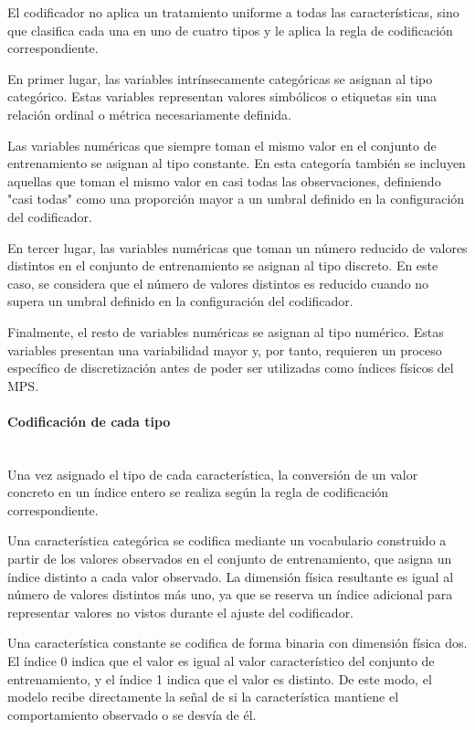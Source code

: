 \documentclass[12pt]{extarticle}
\numberwithin{equation}{section}
\begin{document}
\begin{refsection}
El codificador no aplica un tratamiento uniforme a todas las características, sino que clasifica cada una en uno de cuatro tipos y le aplica la regla de codificación correspondiente.

En primer lugar, las variables intrínsecamente categóricas se asignan al tipo categórico. Estas variables representan valores simbólicos o etiquetas sin una relación ordinal o métrica necesariamente definida.

Las variables numéricas que siempre toman el mismo valor en el conjunto de entrenamiento se asignan al tipo constante. En esta categoría también se incluyen aquellas que toman el mismo valor en casi todas las observaciones, definiendo "casi todas" como una proporción mayor a un umbral definido en la configuración del codificador.

En tercer lugar, las variables numéricas que toman un número reducido de valores distintos en el conjunto de entrenamiento se asignan al tipo discreto. En este caso, se considera que el número de valores distintos es reducido cuando no supera un umbral definido en la configuración del codificador.

Finalmente, el resto de variables numéricas se asignan al tipo numérico. Estas variables presentan una variabilidad mayor y, por tanto, requieren un proceso específico de discretización antes de poder ser utilizadas como índices físicos del MPS.

\paragraph{Codificación de cada tipo}
\label{par:codificacioncadatipo}
\mbox{}\\

Una vez asignado el tipo de cada característica, la conversión de un valor concreto en un índice entero se realiza según la regla de codificación correspondiente.

Una característica categórica se codifica mediante un vocabulario construido a partir de los valores observados en el conjunto de entrenamiento, que asigna un índice distinto a cada valor observado. La dimensión física resultante es igual al número de valores distintos más uno, ya que se reserva un índice adicional para representar valores no vistos durante el ajuste del codificador.

Una característica constante se codifica de forma binaria con dimensión física dos. El índice 0 indica que el valor es igual al valor característico del conjunto de entrenamiento, y el índice 1 indica que el valor es distinto. De este modo, el modelo recibe directamente la señal de si la característica mantiene el comportamiento observado o se desvía de él.


\end{refsection}
\end{document}
